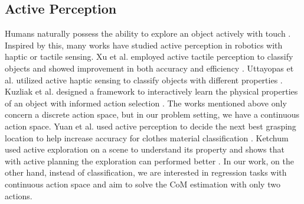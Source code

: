 \subsection{Active Perception}
Humans naturally possess the ability to explore an object actively with touch \cite{activetouch}. Inspired by this, many works have studied active perception in robotics with haptic or tactile sensing. 
Xu et al. employed active tactile perception to classify objects and showed improvement in both accuracy and efficiency \cite{xu23tandem3d}. Uttayopas et al. utilized active haptic sensing to classify objects with different properties \cite{Utta23haptic}. Kuzliak et al. designed a framework to interactively learn the physical properties of an object with informed action selection \cite{kruzliak2024interactivelearningphysicalobject}. The works mentioned above only concern a discrete action space, but in our problem setting, we have a continuous action space. Yuan et al. used active perception to decide the next best grasping location to help increase accuracy for clothes material classification \cite{clothes}. Ketchum used active exploration on a scene to understand its property and shows that with active planning the exploration can performed better \cite{biotacHaptic24}. In our work, on the other hand, instead of classification, we are interested in regression tasks with continuous action space and aim to solve the CoM estimation with only two actions.